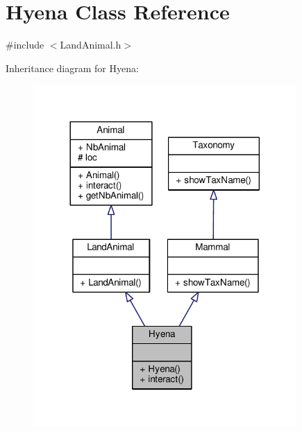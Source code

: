 \hypertarget{classHyena}{}\section{Hyena Class Reference}
\label{classHyena}


{\ttfamily \#include $<$Land\+Animal.\+h$>$}



Inheritance diagram for Hyena\+:
\nopagebreak
\begin{figure}[H]
\begin{center}
\leavevmode
\includegraphics[width=284pt]{classHyena__inherit__graph}
\end{center}
\end{figure}


